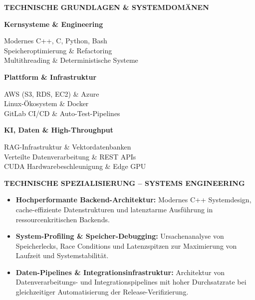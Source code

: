 \documentclass[10pt,a4paper]{article}
\begin{document}
\colorbox{primary!10}{%
\parbox{\dimexpr\textwidth-2\fboxsep\relax}{%
    \vspace{0.10cm}
    \centering
    {\bfseries\color{primary} TECHNISCHE GRUNDLAGEN \& SYSTEMDOMÄNEN\par}
    \vspace{0.08cm}

    \begin{minipage}[t]{0.31\linewidth}
        \raggedright
        \textbf{\color{primary}Kernsysteme \& Engineering}\par
        Modernes C++, C, Python, Bash\\
        Speicheroptimierung \& Refactoring\\
        Multithreading \& Deterministische Systeme
    \end{minipage}
    \hfill
    \begin{minipage}[t]{0.31\linewidth}
        \raggedright
        \textbf{\color{primary}Plattform \& Infrastruktur}\par
        AWS (S3, RDS, EC2) \& Azure\\
        Linux-Ökosystem \& Docker\\
        GitLab CI/CD \& Auto-Test-Pipelines
    \end{minipage}
    \hfill
    \begin{minipage}[t]{0.31\linewidth}
        \raggedright
        \textbf{\color{primary}KI, Daten \& High-Throughput}\par
        RAG-Infrastruktur \& Vektordatenbanken\\
        Verteilte Datenverarbeitung \& REST APIs\\
        CUDA Hardwarebeschleunigung \& Edge GPU
    \end{minipage}

    \vspace{0.08cm}
}%
}

\vspace{0.20cm}
\textbf{\color{primary}TECHNISCHE SPEZIALISIERUNG -- SYSTEMS ENGINEERING}
\begin{itemize}
    \item \textbf{Hochperformante Backend-Architektur:} Modernes C++ Systemdesign, cache-effiziente Datenstrukturen und latenztarme Ausführung in ressourcenkritischen Backends.
    \item \textbf{System-Profiling \& Speicher-Debugging:} Ursachenanalyse von Speicherlecks, Race Conditions und Latenzspitzen zur Maximierung von Laufzeit und Systemstabilität.
    \item \textbf{Daten-Pipelines \& Integrationsinfrastruktur:} Architektur von Datenverarbeitungs- und Integrationspipelines mit hoher Durchsatzrate bei gleichzeitiger Automatisierung der Release-Verifizierung.
\end{itemize}
\end{document}
